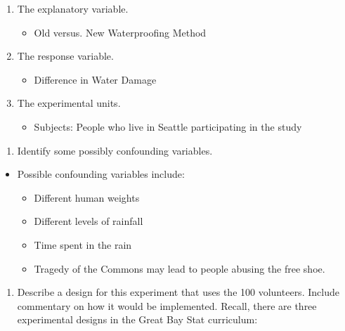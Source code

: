 \documentclass[letterpaper]{article}
\def\tightlist{}
\begin{document}
\begin{enumerate}
\def\labelenumi{\arabic{enumi})}
\tightlist
\item
  The explanatory variable.

  \begin{itemize}
  \tightlist
  \item
    Old versus. New Waterproofing Method
  \end{itemize}
\item
  The response variable.

  \begin{itemize}
  \tightlist
  \item
    Difference in Water Damage
  \end{itemize}
\item
  The experimental units.

  \begin{itemize}
  \tightlist
  \item
    Subjects: People who live in Seattle participating in the study
  \end{itemize}
\end{enumerate}

\begin{enumerate}
\def\labelenumi{(\alph{enumi})}
\setcounter{enumi}{1}
\tightlist
\item
  Identify some possibly confounding variables.
\end{enumerate}

\begin{itemize}
\tightlist
\item
  Possible confounding variables include:

  \begin{itemize}
  \tightlist
  \item
    Different human weights
  \item
    Different levels of rainfall
  \item
    Time spent in the rain
  \item
    Tragedy of the Commons may lead to people abusing the free shoe.
  \end{itemize}
\end{itemize}

\begin{enumerate}
\def\labelenumi{(\alph{enumi})}
\setcounter{enumi}{2}
\tightlist
\item
  Describe a design for this experiment that uses the 100 volunteers. Include commentary on how it would be implemented. Recall, there are three experimental designs in the Great Bay Stat curriculum:
\end{enumerate}
\end{document}

